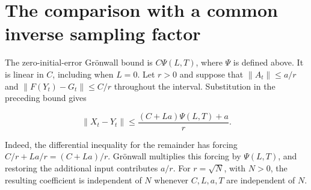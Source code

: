 \documentclass[11pt,a4paper]{article}
\begin{document}
\section{\texorpdfstring{The comparison with a common inverse sampling factor}{The comparison with a common inverse sampling factor}}


The zero-initial-error Grönwall bound is \(C\Psi(L,T)\), where \(\Psi\) is defined above. It is linear in \(C\), including when \(L=0\). Let \(r>0\) and suppose that \(\|A_t\|\le a/r\) and \(\|F(Y_t)-G_t\|\le C/r\) throughout the interval. Substitution in the preceding bound gives

\[\|X_t-Y_t\|\le\frac{(C+La)\Psi(L,T)+a}{r}.\]

Indeed, the differential inequality for the remainder has forcing \(C/r+La/r=(C+La)/r\). Grönwall multiplies this forcing by \(\Psi(L,T)\), and restoring the additional input contributes \(a/r\). For \(r=\sqrt N\), with \(N>0\), the resulting coefficient is independent of \(N\) whenever \(C,L,a,T\) are independent of \(N\).
\end{document}
